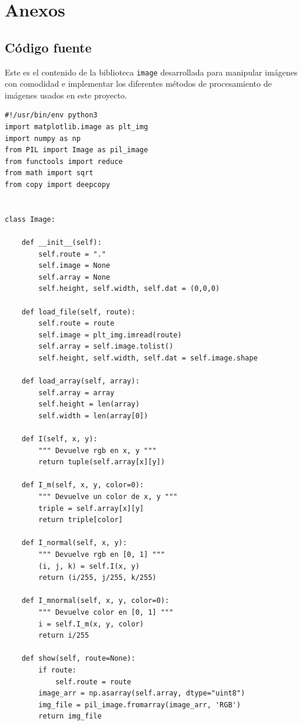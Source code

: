 \documentclass[letter]{article}
\begin{document}
\newpage




\newpage

\section{Anexos}
\label{sec:orga14eedd}
\subsection{Código fuente}
\label{sec:orgef80b0a}
Este es el contenido de la biblioteca \texttt{image} desarrollada para manipular
imágenes con comodidad e implementar los diferentes métodos de procesamiento de
imágenes usados en este proyecto.

\begin{verbatim}
#!/usr/bin/env python3
import matplotlib.image as plt_img
import numpy as np
from PIL import Image as pil_image
from functools import reduce
from math import sqrt
from copy import deepcopy


class Image:

    def __init__(self):
        self.route = "."
        self.image = None
        self.array = None
        self.height, self.width, self.dat = (0,0,0)

    def load_file(self, route):
        self.route = route
        self.image = plt_img.imread(route)
        self.array = self.image.tolist()
        self.height, self.width, self.dat = self.image.shape

    def load_array(self, array):
        self.array = array
        self.height = len(array)
        self.width = len(array[0])

    def I(self, x, y):
        """ Devuelve rgb en x, y """
        return tuple(self.array[x][y])

    def I_m(self, x, y, color=0):
        """ Devuelve un color de x, y """
        triple = self.array[x][y]
        return triple[color]

    def I_normal(self, x, y):
        """ Devuelve rgb en [0, 1] """
        (i, j, k) = self.I(x, y)
        return (i/255, j/255, k/255)

    def I_mnormal(self, x, y, color=0):
        """ Devuelve color en [0, 1] """
        i = self.I_m(x, y, color)
        return i/255

    def show(self, route=None):
        if route:
            self.route = route
        image_arr = np.asarray(self.array, dtype="uint8")
        img_file = pil_image.fromarray(image_arr, 'RGB')
        return img_file


\end{verbatim}
\end{document}
